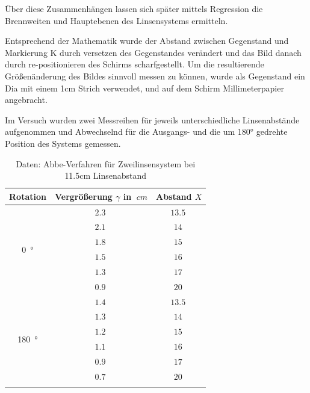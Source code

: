 Über diese Zusammenhängen lassen sich später mittels Regression die Brennweiten und Hauptebenen des Linsensystems ermitteln.

Entsprechend der Mathematik wurde der Abstand zwischen Gegenstand und Markierung K durch versetzen des Gegenstandes verändert und das Bild danach durch re-positionieren des Schirms scharfgestellt.
Um die resultierende Größenänderung des Bildes sinnvoll messen zu können, wurde als Gegenstand ein Dia mit einem 1cm Strich verwendet, und auf dem Schirm Millimeterpapier angebracht.

Im Versuch wurden zwei Messreihen für jeweils unterschiedliche Linsenabstände aufgenommen und Abwechselnd für die Ausgangs- und die um 180° gedrehte Position des Systems gemessen.

\begin{table}[h!]
    \begin{center}
        \caption{Daten: Abbe-Verfahren für Zweilinsensystem bei 11.5cm Linsenabstand}
        \begin{tabular}{ccc}
            \hline
            Rotation   &  Vergrößerung  $\gamma$ in $\SI{}{cm}$    & Abstand $X$ \\
            \hline
            \multirow{6}{*}{\SI{0}{\degree}}    & $\SI{2.3}{}$ & $\SI{13.5}{}$ \\
                                                & $\SI{2.1}{}$ & $\SI{14}{}$ \\
                                                & $\SI{1.8}{}$ & $\SI{15}{}$ \\
                                                & $\SI{1.5}{}$ & $\SI{16}{}$ \\
                                                & $\SI{1.3}{}$ & $\SI{17}{}$ \\
                                                & $\SI{0.9}{}$ & $\SI{20}{}$ \\
            \hline
            \multirow{6}{*}{\SI{180}{\degree}}  & $\SI{1.4}{}$ & $\SI{13.5}{}$ \\
                                                & $\SI{1.3}{}$ & $\SI{14}{}$ \\
                                                & $\SI{1.2}{}$ & $\SI{15}{}$ \\
                                                & $\SI{1.1}{}$ & $\SI{16}{}$ \\
                                                & $\SI{0.9}{}$ & $\SI{17}{}$ \\
                                                & $\SI{0.7}{}$ & $\SI{20}{}$ \\
            \hline
            \label{tab:Abbe1}
        \end{tabular}
    \end{center}
\end{table}

